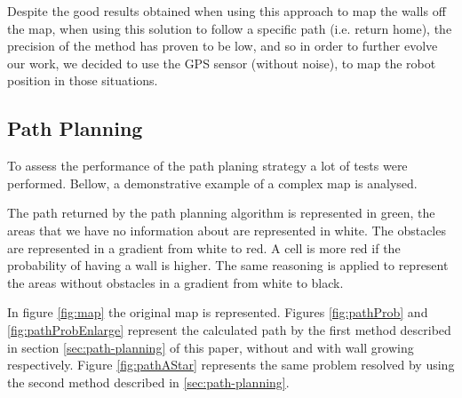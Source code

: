 \documentclass[oribibl]{llncs}
\begin{document}
Despite the good results obtained when using this approach to map the walls off the map, when using this solution to follow a specific path (i.e. return home), the precision of the method has proven to be low, and so in order to further evolve our work, we decided to use the GPS sensor (without noise), to map the robot position in  those situations.

\subsection{Path Planning}
To assess the performance of the path planing strategy a lot of tests were performed. Bellow, a demonstrative example of a complex map is analysed. 

The path returned by the path planning algorithm is represented in green, the areas that we have no information about are represented in white. The obstacles are represented in a gradient from white to red. A cell is more red if the probability of having a wall is higher. The same reasoning is applied to represent the areas without obstacles in a gradient from white to black.

In figure \ref{fig:map} the original map is represented. Figures \ref{fig:pathProb} and  \ref{fig:pathProbEnlarge} represent the calculated path by the first method described in section \ref{sec:path-planning} of this paper, without and with wall growing respectively. Figure \ref{fig:pathAStar} represents the same problem resolved by using the second method described in \ref{sec:path-planning}.
\end{document}
